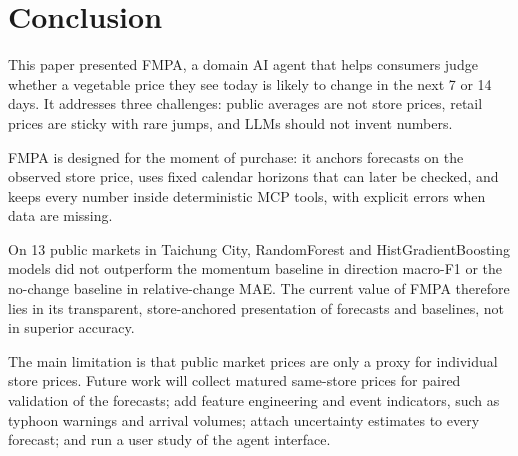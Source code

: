 \section{Conclusion}\label{sec:conclusion}

This paper presented FMPA, a domain AI agent that helps consumers judge whether
a vegetable price they see today is likely to change in the next 7 or 14 days.
It addresses three challenges: public averages are not store prices, retail
prices are sticky with rare jumps, and LLMs should not invent numbers.

FMPA is designed for the moment of purchase: it anchors forecasts on the
observed store price, uses fixed calendar horizons that can later be checked,
and keeps every number inside deterministic MCP tools, with explicit errors
when data are missing.

On 13 public markets in Taichung City, RandomForest and HistGradientBoosting
models did not outperform the momentum baseline in direction macro-F1 or the
no-change baseline in relative-change MAE. The current value of FMPA therefore
lies in its transparent, store-anchored presentation of forecasts and
baselines, not in superior accuracy.

The main limitation is that public market prices are only a proxy for
individual store prices. Future work will collect matured same-store prices
for paired validation of the forecasts; add feature engineering and event
indicators, such as typhoon warnings and arrival volumes; attach uncertainty
estimates to every forecast; and run a user study of the agent interface.
